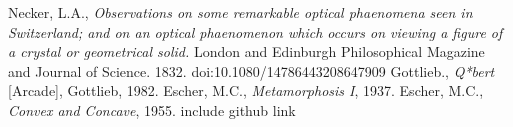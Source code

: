 \documentclass[a4paper, 11pt]{article}
\begin{document}
\newpage
\begin{thebibliography}{9}
 Necker, L.A., \emph{Observations on some remarkable optical phaenomena seen in Switzerland; and on an optical phaenomenon which occurs on viewing a figure of a crystal or geometrical solid.} London and Edinburgh Philosophical Magazine and Journal of Science. 1832. doi:10.1080/14786443208647909
 Gottlieb., \emph{Q*bert} [Arcade], Gottlieb, 1982.
 Escher, M.C., \emph{Metamorphosis I}, 1937.
 Escher, M.C., \emph{Convex and Concave}, 1955.
 include github link
\end{thebibliography}
\end{document}
